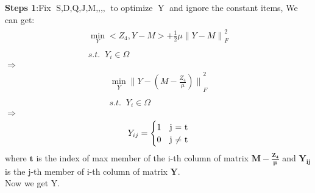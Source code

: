 \documentclass{article}
\begin{document}
\begin{flushleft}
\textbf{Steps 1}:\;\;Fix $\mathop{S,D,Q,J,M,Z_1,Z_2,Z_3,Z_4}$ to optimize $\mathop{Y}$ and ignore the constant items, We can get:
\begin{eqnarray}
\begin{array}{l}
      \mathop{\min}\limits_{Y} <Z_4,Y-M> + \frac{1}{2}\mu{\parallel Y - M\parallel}_F^2\\\\
      s.t. \;\;  Y_i \in \Omega
\end{array}
\end{eqnarray}
$\Longrightarrow $
\begin{eqnarray}
\begin{array}{l}
    \mathop{\min}\limits_{Y} {\parallel Y - (M - \frac{Z_4}{\mu})\parallel}_F^2\\\\
      s.t. \;\;  Y_i \in \Omega
\end{array}
\end{eqnarray}
$\Longrightarrow $
\begin{eqnarray}
\begin{array}{l}
$$ Y_{ij}=
\begin{cases}
1& \text{j = t}\\
0& \text{j $\neq$ t}
\end{cases}$$
\end{array}
\end{eqnarray}
where $\mathbf{t}$ is the index of max member of the i-th column of matrix $\mathbf{M - \frac{Z_4}{\mu}}$ and $\mathbf{Y_{ij}}$ is the j-th member of i-th column of matrix $\mathbf{Y}$.\\

Now we get Y.\\
\end{flushleft}
\end{document}
